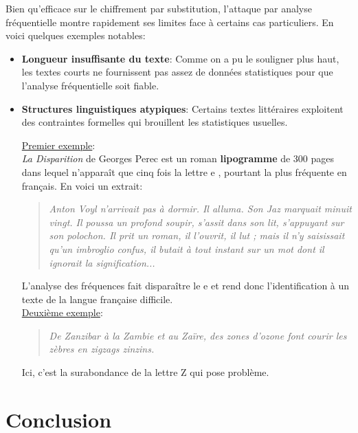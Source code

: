 \documentclass[a4paper]{article}
\begin{document}
Bien qu'efficace sur le chiffrement par substitution, l'attaque par analyse fréquentielle montre rapidement ses limites face à certains cas particuliers. En voici quelques exemples notables:
\begin{itemize}
    \item \textbf{Longueur insuffisante du texte}: Comme on a pu le souligner plus haut, les textes courts ne fournissent pas assez de données statistiques pour que l'analyse fréquentielle soit fiable.
    \item \textbf{Structures linguistiques atypiques}: Certains textes littéraires exploitent des contraintes formelles qui brouillent les statistiques usuelles. 

    \underline{Premier exemple}:\\

    \textit{La Disparition} de Georges Perec est un roman \textbf{lipogramme} de 300 pages dans lequel n'apparaît que cinq fois la lettre \og e \fg{}, pourtant la plus fréquente en français. En voici un extrait:

    \begin{quote}
        \textit{Anton Voyl n’arrivait pas à dormir. Il alluma. Son Jaz marquait minuit vingt. Il poussa un profond soupir, s’assit dans son lit, s’appuyant sur son polochon. Il prit un roman, il l’ouvrit, il lut ; mais il n’y saisissait qu’un imbroglio confus, il butait à tout instant sur un mot dont il ignorait la signification...}
    \end{quote}

    L’analyse des fréquences fait disparaître le \og e \fg{} et rend donc l'identification à un texte de la langue française difficile.\\

    \underline{Deuxième exemple}:

    \begin{quote}
        \textit{De Zanzibar à la Zambie et au Zaïre, des zones d’ozone font courir les zèbres en zigzags zinzins.}
    \end{quote}

    Ici, c’est la surabondance de la lettre \og Z \fg{} qui pose problème.

\end{itemize}

\section{Conclusion}


\clearpage
\end{document}
